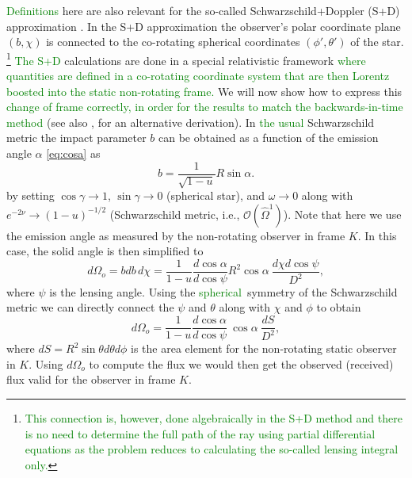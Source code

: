 \documentclass{aa}
\newcommand{\be}{\begin{equation}}
\newcommand{\ee}{\end{equation}}
\newcommand{\refe}[1]{\textcolor{green}{{#1}}}
\newcommand{\sch}{Schwarzschild }
\newcommand{\Ob}{\ensuremath{\hat{\Omega}}}
\begin{document}
\refe{Definitions} here are also relevant for the so-called Schwarzschild+Doppler (S+D) approximation \cite[see e.g.,][]{PB06}.
In the S+D approximation the observer's polar coordinate plane $(b,\chi)$ is connected to the co-rotating spherical coordinates $(\phi', \theta')$ of the star.%
\footnote{ \refe{This connection is, however, done algebraically in the S+D method and there is no need to determine the full path of the ray using partial differential equations as the problem reduces to calculating the so-called lensing integral only.}
}
\refe{The S+D} calculations are done in a special relativistic framework \refe{where quantities are defined in a co-rotating coordinate system that are then Lorentz boosted into the static non-rotating frame.}
We will now show how to express this \refe{change of frame correctly, in order for the results to match the backwards-in-time method} (see also \citealt{CML07}, for an alternative derivation).
In \refe{the usual} \sch metric the impact parameter $b$ can be obtained as a function of the emission angle $\alpha$ \eqref{eq:cosa} as
\be
b = \frac{1}{\sqrt{1-u}} R \sin\alpha.
\ee
by setting $\cos\gamma \rightarrow 1$, $\sin\gamma \rightarrow 0$ (spherical star), and $\omega \rightarrow 0$ along with $e^{-2\nu} \rightarrow (1-u)^{-1/2}$ (\sch metric, i.e., $\mathcal{O}(\Ob^1)$).
Note that here we use the emission angle as measured by the non-rotating observer in frame $K$.
In this case, the solid angle is then simplified to 
\be
d\Omega_o = bdb \, d\chi = \frac{1}{1-u} \frac{d \cos\alpha}{d \cos\psi} R^2 \cos\alpha ~ \frac{d\chi d\cos\psi}{D^2},
\ee
where $\psi$ is the lensing angle.
Using the \refe{spherical} symmetry of the \sch metric we can directly connect the $\psi$ and $\theta$ along with $\chi$ and $\phi$ to obtain
\be
d\Omega_o = \frac{1}{1-u} \frac{d \cos\alpha}{d \cos\psi} ~\cos\alpha ~ \frac{dS}{D^2},
\ee
where $dS = R^2 \sin\theta d\theta d\phi$ is the area element for the non-rotating static observer in $K$.
Using $d\Omega_o$ to compute the flux we would then get the observed (received) flux valid for the observer in frame $K$.
\end{document}
